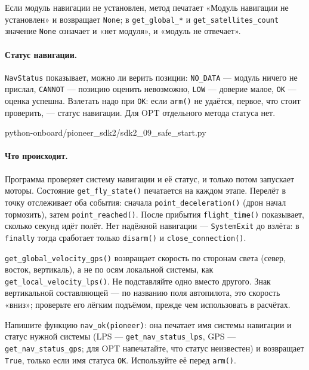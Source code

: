 Если модуль навигации не установлен, метод печатает «Модуль навигации не установлен» и возвращает \verb|None|; в \verb|get_global_*| и \verb|get_satellites_count| значение \verb|None| означает и «нет модуля», и «модуль не отвечает».

\paragraph{Статус навигации.} \verb|NavStatus| показывает, можно ли верить позиции: \verb|NO_DATA| --- модуль ничего не прислал, \verb|CANNOT| --- позицию оценить невозможно, \verb|LOW| --- доверие малое, \verb|OK| --- оценка успешна. Взлетать надо при \verb|OK|: если \verb|arm()| не удаётся, первое, что стоит проверить, --- статус навигации. Для OPT отдельного метода статуса нет.

\begin{codefile}[python]{python-onboard/pioneer_sdk2/sdk2_09_safe_start.py}
\end{codefile}

\paragraph{Что происходит.} Программа проверяет систему навигации и её статус, и только потом запускает моторы. Состояние \verb|get_fly_state()| печатается на каждом этапе. Перелёт в точку отслеживает оба события: сначала \verb|point_deceleration()| (дрон начал тормозить), затем \verb|point_reached()|. После прибытия \verb|flight_time()| показывает, сколько секунд идёт полёт. Нет надёжной навигации --- \verb|SystemExit| до взлёта: в \verb|finally| тогда сработает только \verb|disarm()| и \verb|close_connection()|.

\begin{warnbox}
\verb|get_global_velocity_gps()| возвращает скорость по сторонам света (север, восток, вертикаль), а не по осям локальной системы, как \verb|get_local_velocity_lps()|. Не подставляйте одно вместо другого. Знак вертикальной составляющей --- по названию поля автопилота, это скорость «вниз»; проверьте его лёгким подъёмом, прежде чем использовать в расчётах.
\end{warnbox}

\begin{taskbox}
Напишите функцию \verb|nav_ok(pioneer)|: она печатает имя системы навигации и статус нужной системы (LPS --- \verb|get_nav_status_lps|, GPS --- \verb|get_nav_status_gps|; для OPT напечатайте, что статус неизвестен) и возвращает \verb|True|, только если имя статуса \verb|OK|. Используйте её перед \verb|arm()|.
\end{taskbox}

